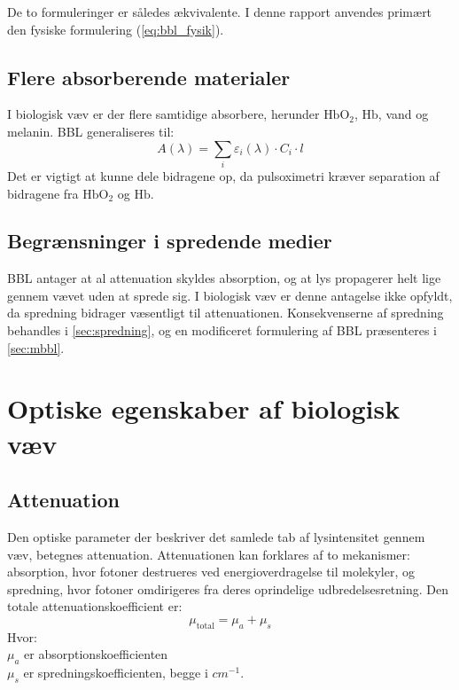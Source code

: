De to formuleringer er således ækvivalente. I denne rapport anvendes primært den fysiske formulering (\cref{eq:bbl_fysik}).

\subsection{Flere absorberende materialer}
I biologisk væv er der flere samtidige absorbere, herunder $\text{HbO}_2$, $\text{Hb}$, vand og melanin. BBL generaliseres til:
\begin{equation}
    A(\lambda) = \sum_i \varepsilon_i(\lambda) \cdot C_i \cdot l
    \label{eq:bbl_multi}
\end{equation}
Det er vigtigt at kunne dele bidragene op, da pulsoximetri kræver separation af bidragene fra $\text{HbO}_2$ og $\text{Hb}$.

\subsection{Begrænsninger i spredende medier}
BBL antager at al attenuation skyldes absorption, og at lys propagerer helt lige gennem vævet uden at sprede sig. I biologisk væv er denne antagelse ikke opfyldt, da spredning bidrager væsentligt til attenuationen. Konsekvenserne af spredning behandles i \cref{sec:spredning}, og en modificeret formulering af BBL præsenteres i \cref{sec:mbbl}.


\section{Optiske egenskaber af biologisk væv}
\label{sec:optik_vaev}

\subsection{Attenuation}
Den optiske parameter der beskriver det samlede tab af lysintensitet gennem væv, betegnes attenuation. Attenuationen kan forklares af to mekanismer: absorption, hvor fotoner destrueres ved energioverdragelse til molekyler, og spredning, hvor fotoner omdirigeres fra deres oprindelige udbredelsesretning. Den totale attenuationskoefficient er:
\begin{equation}
    \mu_{\text{total}} = \mu_a + \mu_s
    \label{eq:mu_total}
\end{equation}
Hvor: \\
$\mu_a$ er absorptionskoefficienten \\
$\mu_s$ er spredningskoefficienten, begge i $\si{cm^{-1}}$.

